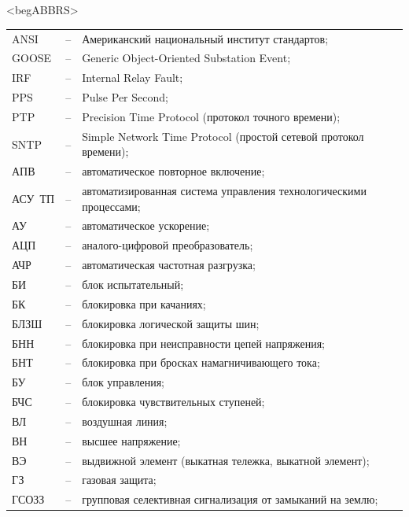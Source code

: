 \color{uniblue}\section*{}
{\color{white}\fontsize{0.1pt}{0.1pt}\selectfont<begABBRS>}
\color{black}
\begin{longtable}{>{\raggedright\arraybackslash}m{2cm}>{\raggedright\arraybackslash}m{0.5cm}>{\raggedright\arraybackslash}m{20cm}}
\endfirsthead\endhead\endfoot\endlastfoot
ANSI & -- & Американский национальный институт стандартов; \\
GOOSE & -- & Generic Object-Oriented Substation Event; \\
IRF & -- & Internal Relay Fault; \\
PPS & -- & Pulse Per Second; \\
PTP & -- & Precision Time Protocol (протокол точного времени); \\
SNTP & -- & Simple Network Time Protocol (простой сетевой протокол времени); \\
АПВ & -- & автоматическое повторное включение; \\
АСУ~ТП & -- & автоматизированная система управления технологическими процессами; \\
АУ & -- & автоматическое ускорение; \\
АЦП & -- & аналого-цифровой преобразователь; \\
АЧР & -- & автоматическая частотная разгрузка; \\
БИ & -- & блок испытательный; \\
БК & -- & блокировка при качаниях; \\
БЛЗШ & -- & блокировка логической защиты шин; \\
БНН & -- & блокировка при неисправности цепей напряжения; \\
БНТ & -- & блокировка при бросках намагничивающего тока; \\
БУ & -- & блок управления; \\
БЧС & -- & блокировка чувствительных ступеней; \\
ВЛ & -- & воздушная линия; \\
ВН & -- & высшее напряжение; \\
ВЭ & -- & выдвижной элемент (выкатная тележка, выкатной элемент); \\
ГЗ & -- & газовая защита; \\
ГСОЗЗ & -- & групповая селективная сигнализация от замыканий на землю; \\

\end{longtable}
